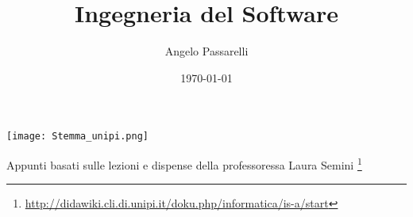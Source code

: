 \documentclass{article}
\title{Ingegneria del Software}
\author{Angelo Passarelli}
\date{\today}
\theoremstyle{definition}
\begin{document}
    
    \maketitle
    \begin{center}
        \texttt{[image: Stemma\_unipi.png]}
    \end{center}
    \vspace{1cm}
    \begin{center}
        Appunti basati sulle lezioni e dispense della professoressa Laura Semini \footnote{\url{http://didawiki.cli.di.unipi.it/doku.php/informatica/is-a/start}}
    \end{center}
    \pagebreak
    \tableofcontents
    \pagebreak

    \begin{sloppypar}
        
        
        
        
    \end{sloppypar}
\end{document}
